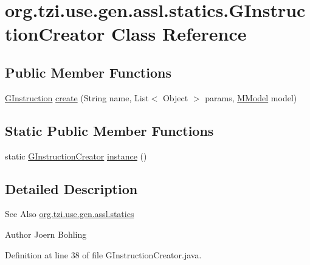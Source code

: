 \hypertarget{classorg_1_1tzi_1_1use_1_1gen_1_1assl_1_1statics_1_1_g_instruction_creator}{\section{org.\-tzi.\-use.\-gen.\-assl.\-statics.\-G\-Instruction\-Creator Class Reference}
\label{classorg_1_1tzi_1_1use_1_1gen_1_1assl_1_1statics_1_1_g_instruction_creator}
}
\subsection*{Public Member Functions}
\begin{DoxyCompactItemize}
\item 
\hyperlink{interfaceorg_1_1tzi_1_1use_1_1gen_1_1assl_1_1statics_1_1_g_instruction}{G\-Instruction} \hyperlink{classorg_1_1tzi_1_1use_1_1gen_1_1assl_1_1statics_1_1_g_instruction_creator_ab1a0f6319a09fc12e26aaf7b4ce01d00}{create} (String name, List$<$ Object $>$ params, \hyperlink{classorg_1_1tzi_1_1use_1_1uml_1_1mm_1_1_m_model}{M\-Model} model)
\end{DoxyCompactItemize}
\subsection*{Static Public Member Functions}
\begin{DoxyCompactItemize}
\item 
static \hyperlink{classorg_1_1tzi_1_1use_1_1gen_1_1assl_1_1statics_1_1_g_instruction_creator}{G\-Instruction\-Creator} \hyperlink{classorg_1_1tzi_1_1use_1_1gen_1_1assl_1_1statics_1_1_g_instruction_creator_a615c0e0c1eafdef83b644445a92d5789}{instance} ()
\end{DoxyCompactItemize}


\subsection{Detailed Description}
\begin{DoxySeeAlso}{See Also}
\hyperlink{namespaceorg_1_1tzi_1_1use_1_1gen_1_1assl_1_1statics}{org.\-tzi.\-use.\-gen.\-assl.\-statics} 
\end{DoxySeeAlso}
\begin{DoxyAuthor}{Author}
Joern Bohling 
\end{DoxyAuthor}


Definition at line 38 of file G\-Instruction\-Creator.\-java.




